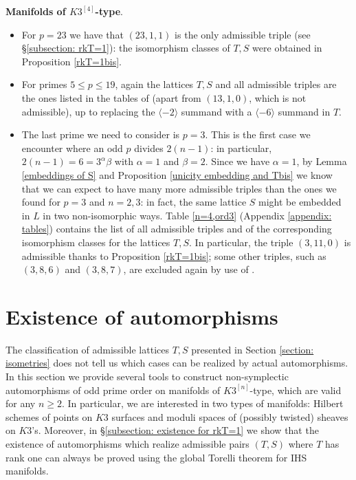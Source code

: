 \documentclass{amsart}
\theoremstyle{definition}
\newcommand{\hskq}{K3^{\left[4\right]}}
\newcommand{\hskn}{K3^{\left[n\right]}}
\begin{document}
\textbf{Manifolds of $\hskq$-type}.
\begin{itemize}
\item For $p=23$ we have that $(23,1,1)$ is the only admissible triple (see \S \ref{subsection: rkT=1}): the isomorphism classes of $T,S$ were obtained in Proposition \ref{rkT=1bis}.

\item For primes $5 \leq p \leq 19$, again the lattices $T,S$ and all admissible triples are the ones listed in the tables of \cite[Appendix A]{bcs} (apart from $(13,1,0)$, which is not admissible), up to replacing the $\langle -2 \rangle$ summand with a $\langle -6 \rangle$ summand in $T$.

\item The last prime we need to consider is $p=3$. This is the first case we encounter where an odd $p$ divides $2(n-1)$: in particular, $2(n-1) = 6 = 3^\alpha \beta$ with $\alpha = 1$ and $\beta = 2$. Since we have $\alpha = 1$, by Lemma \ref{embeddings of S} and Proposition \ref{unicity embedding and Tbis} we know that we can expect to have many more admissible triples than the ones we found for $p=3$ and $n=2,3$: in fact, the same lattice $S$ might be embedded in $L$ in two non-isomorphic ways. Table \ref{n=4,ord3} (Appendix \ref{appendix: tables}) contains the list of all admissible triples and of the corresponding isomorphism classes for the lattices $T,S$. In particular, the triple $(3,11,0)$ is admissible thanks to Proposition \ref{rkT=1bis}; some other triples, such as $(3,8,6)$ and $(3,8,7)$, are excluded again by use of \cite[Theorem 1.10.1]{nikulin}.
\end{itemize}

\section{Existence of automorphisms}

The classification of admissible lattices $T,S$ presented in Section \ref{section: isometries} does not tell us which cases can be realized by actual automorphisms. In this section we provide several tools to construct non-symplectic automorphisms of odd prime order on manifolds of $\hskn$-type, which are valid for any $n \geq 2$. In particular, we are interested in two types of manifolds: Hilbert schemes of points on $K3$ surfaces and moduli spaces of (possibly twisted) sheaves on $K3$'s. Moreover, in \S \ref{subsection: existence for rkT=1} we show that the existence of automorphisms which realize admissible pairs $(T,S)$ where $T$ has rank one can always be proved using the global Torelli theorem for IHS manifolds.
\end{document}
